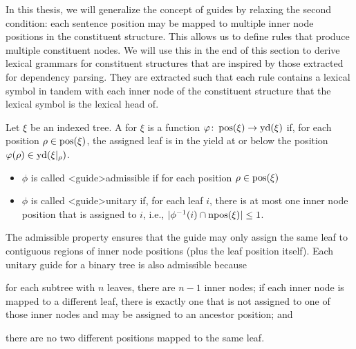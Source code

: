 \documentclass[../../document.tex]{subfiles}
\begin{document}
    In this thesis, we will generalize the concept of guides by relaxing the second condition: each sentence position may be mapped to multiple inner node positions in the constituent structure.
    This allows us to define rules that produce multiple constituent nodes.
    We will use this in the end of this section to derive lexical grammars for constituent structures that are inspired by those extracted for dependency parsing.
    They are extracted such that each rule contains a lexical symbol in tandem with each inner node of the constituent structure that the lexical symbol is the lexical head of.

    \begin{definition}[Guide]
        Let \(\xi\) be an indexed tree.
        A  for \(\xi\) is a function \(\varphi\colon \operatorname{pos}(\xi) \to \operatorname{yd}(\xi)\) if, for each position \(\rho \in \operatorname{pos}(\xi)\), the assigned leaf is in the yield at or below the position \(\varphi(\rho) \in \operatorname{yd}(\xi|_\rho)\).
        \begin{itemize}
            \item \(\phi\) is called <guide>{admissible} if for each position \(\rho \in \operatorname{pos}(\xi)\)
            \item \(\phi\) is called <guide>{unitary} if, for each leaf \(i\), there is at most one inner node position that is assigned to \(i\), i.e., \(|\phi^{-1}(i) \cap \operatorname{npos}(\xi)| \leq 1\).
        \end{itemize}
    \end{definition}

    The admissible property ensures that the guide may only assign the same leaf to contiguous regions of inner node positions (plus the leaf position itself).
    Each unitary guide for a binary tree is also admissible because
    \begin{inparaenum}
        \item for each subtree with \(n\) leaves, there are \(n-1\) inner nodes; if each inner node is mapped to a different leaf, there is exactly one that is not assigned to one of those inner nodes and may be assigned to an ancestor position; and
        \item there are no two different positions mapped to the same leaf.
    \end{inparaenum}
\end{document}
